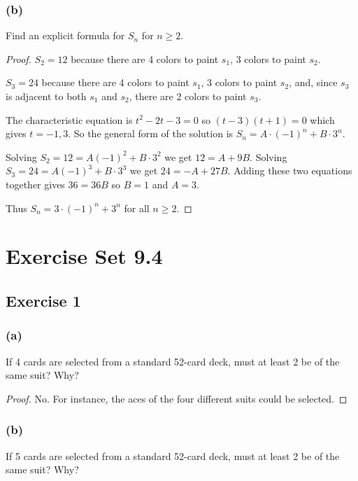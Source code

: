 \documentclass[14pt]{extarticle}
\begin{document}
\subsubsection{(b)}
Find an explicit formula for \(S_n\) for \(n \geq 2\).

\begin{proof}
\(S_2 = 12\) because there are 4 colors to paint \(s_1\), 3 colors to paint \(s_2\).

\(S_3 = 24\) because there are 4 colors to paint \(s_1\), 3 colors to paint \(s_2\), and, since \(s_3\) is adjacent to 
both \(s_1\) and \(s_2\), there are 2 colors to paint \(s_3\).

The characteristic equation is \(t^2 - 2t - 3 = 0\) so \((t-3)(t+1) = 0\) which gives \(t = -1, 3\). So the general
form of the solution is \(S_n = A \cdot (-1)^n + B \cdot 3^n\).

Solving \(S_2 = 12 = A(-1)^2 + B \cdot 3^2\) we get \(12 = A + 9B\). Solving \(S_3 = 24 = A(-1)^3 + B \cdot 3^3\) we get \(24 = -A + 27B\). Adding these two equations together gives \(36 = 36B\) so \(B = 1\) and \(A = 3\). 

Thus \(S_n = 3\cdot(-1)^n + 3^n\) for all \(n \geq 2\).
\end{proof}

\section{Exercise Set 9.4}

\subsection{Exercise 1}
\subsubsection{(a)}
If 4 cards are selected from a standard 52-card deck, must at least 2 be of the same suit? Why?

\begin{proof}
No. For instance, the aces of the four different suits could be selected.
\end{proof}

\subsubsection{(b)}
If 5 cards are selected from a standard 52-card deck, must at least 2 be of the same suit? Why?
\end{document}
